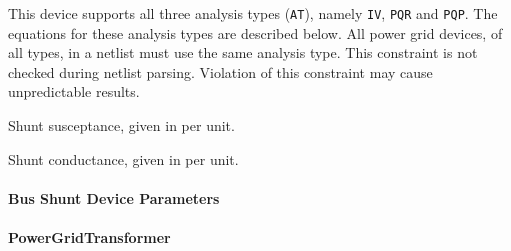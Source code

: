 \begin{Device}
\begin{Parameters}
This device supports all three analysis types (\texttt{AT}), namely \texttt{IV}, 
\texttt{PQR} and \texttt{PQP}.  The equations for these analysis types are described 
below.  All power grid devices, of all types, in a \Xyce{} netlist must use the same
analysis type.  This constraint is not checked during netlist parsing.  Violation of 
this constraint may cause unpredictable results.

Shunt susceptance, given in per unit.

Shunt conductance, given in per unit.

\end{Parameters}
\end{Device}

\paragraph{Bus Shunt Device Parameters}




\paragraph{PowerGridTransformer}

